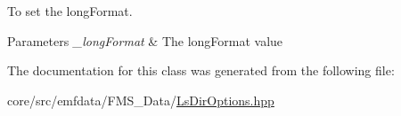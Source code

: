 To set the longFormat. 


\begin{DoxyParams}{Parameters}
{\em \_\-longFormat} & The longFormat value \\
\hline
\end{DoxyParams}


The documentation for this class was generated from the following file:\begin{DoxyCompactItemize}
\item 
core/src/emfdata/FMS\_\-Data/\hyperlink{LsDirOptions_8hpp}{LsDirOptions.hpp}\end{DoxyCompactItemize}
